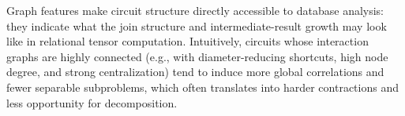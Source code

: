 Graph features make circuit structure directly accessible to database analysis:
they indicate what the join structure and intermediate-result growth may look
like in relational tensor computation. Intuitively, circuits whose interaction
graphs are highly connected (e.g., with diameter-reducing shortcuts, high node
degree, and strong centralization) tend to induce more global correlations and
fewer separable subproblems, which often translates into harder contractions and
less opportunity for decomposition.
